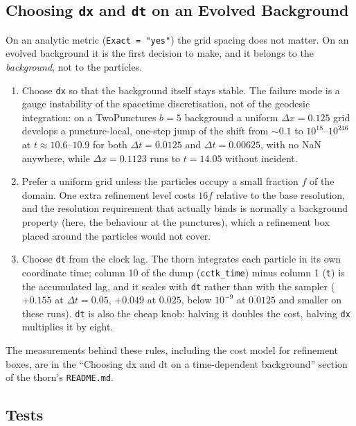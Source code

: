\documentclass{article}
\begin{document}
\subsection{Choosing \texttt{dx} and \texttt{dt} on an Evolved Background}

On an analytic metric (\texttt{Exact = "yes"}) the grid spacing does not
matter.  On an evolved background it is the first decision to make, and it
belongs to the \emph{background}, not to the particles.

\begin{enumerate}
\item Choose \texttt{dx} so that the background itself stays stable.  The
      failure mode is a gauge instability of the spacetime discretisation,
      not of the geodesic integration: on a TwoPunctures $b=5$ background a
      uniform $\Delta x = 0.125$ grid develops a puncture-local, one-step
      jump of the shift from $\sim 0.1$ to $10^{18}$--$10^{246}$ at
      $t \approx 10.6$--$10.9$ for both $\Delta t = 0.0125$ and
      $\Delta t = 0.00625$, with no NaN anywhere, while
      $\Delta x = 0.1123$ runs to $t = 14.05$ without incident.
\item Prefer a uniform grid unless the particles occupy a small fraction $f$
      of the domain.  One extra refinement level costs $16f$ relative to the
      base resolution, and the resolution requirement that actually binds is
      normally a background property (here, the behaviour at the punctures),
      which a refinement box placed around the particles would not cover.
\item Choose \texttt{dt} from the clock lag.  The thorn integrates each
      particle in its own coordinate time; column 10 of the dump
      (\texttt{cctk\_time}) minus column 1 (\texttt{t}) is the accumulated
      lag, and it scales with \texttt{dt} rather than with the sampler
      ($+0.155$ at $\Delta t = 0.05$, $+0.049$ at $0.025$, below $10^{-9}$ at
      $0.0125$ and smaller on these runs).  \texttt{dt} is also the cheap
      knob: halving it doubles the cost, halving \texttt{dx} multiplies it by
      eight.
\end{enumerate}

The measurements behind these rules, including the cost model for refinement
boxes, are in the ``Choosing dx and dt on a time-dependent background''
section of the thorn's \texttt{README.md}.

\subsection{Tests}
\end{document}
